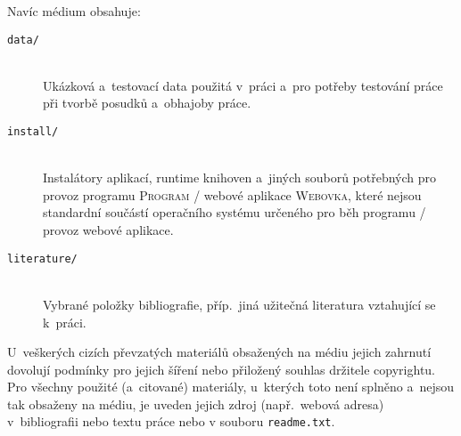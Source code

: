 \documentclass[
  biblatex,
  figures=false,
  glossaries,
  index
]{kidiplom}
\begin{document}
Navíc médium obsahuje:

\begin{description}

\item[\texttt{data/}] \hfill \\
  Ukázková a~testovací data použitá v~práci a~pro potřeby testování
  práce při tvorbě posudků a~obhajoby práce.

\item[\texttt{install/}] \hfill \\
  Instalátory aplikací, runtime knihoven a~jiných souborů potřebných
  pro provoz programu \textsc{Program} / webové aplikace
  \textsc{Webovka}, které nejsou standardní součástí operačního
  systému určeného pro běh programu / provoz webové aplikace.

\item[\texttt{literature/}] \hfill \\
  Vybrané položky bibliografie, příp.~jiná užitečná literatura
  vztahující se k~práci.

\end{description}

U~veškerých cizích převzatých materiálů obsažených na médiu jejich
zahrnutí dovolují podmínky pro jejich šíření nebo přiložený souhlas
držitele copyrightu. Pro všechny použité (a~citované) materiály,
u~kterých toto není splněno a~nejsou tak obsaženy na médiu, je uveden
jejich zdroj (např.~webová adresa) v~bibliografii nebo textu práce
nebo v souboru \texttt{readme.txt}.


\printglossary


\nocite{*}
\printbibliography

%
%

\printindex
\end{document}

